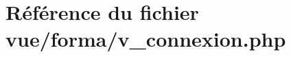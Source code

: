 \hypertarget{v__connexion_8php}{}\section{Référence du fichier vue/forma/v\+\_\+connexion.php}
\label{v__connexion_8php}
